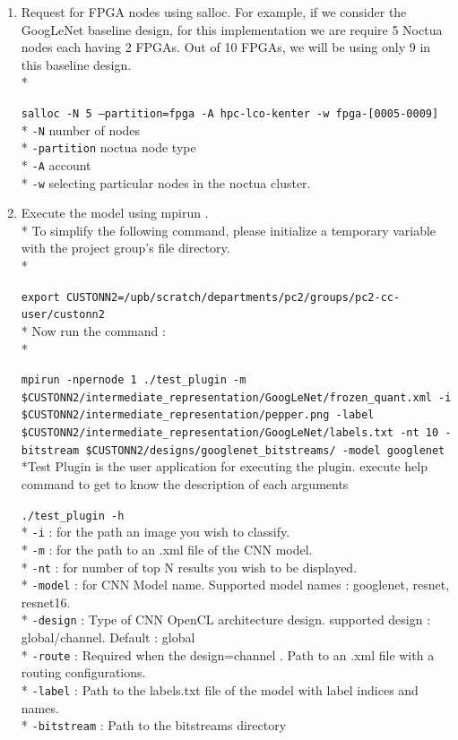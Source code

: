 \begin{enumerate}
\item Request for FPGA nodes using salloc. For example, if we consider the GoogLeNet baseline design, for this implementation we are require 5 Noctua nodes each having 2 FPGAs. Out of 10 FPGAs, we will be using only 9 in this baseline design. \medskip \\* \raggedright\texttt{salloc -N 5 --partition=fpga -A hpc-lco-kenter -w fpga-[0005-0009]} \medskip \\* \texttt{-N} number of nodes \\* \texttt{-partition} noctua node type \\* \texttt{-A} account  \\* \texttt{-w} selecting particular nodes in the noctua cluster.
\item Execute the model using mpirun . \\* To simplify the following command, please initialize a temporary variable with the project group's file directory. \\* \raggedright\texttt{export CUSTONN2=/upb/scratch/departments/pc2/groups/pc2-cc-user/custonn2} \medskip \\* Now run the command : \medskip \\* \raggedright\texttt{mpirun -npernode 1 ./test\_plugin -m \$CUSTONN2/intermediate\_representation/GoogLeNet/frozen\_quant.xml -i \$CUSTONN2/intermediate\_representation/pepper.png -label \$CUSTONN2/intermediate\_representation/GoogLeNet/labels.txt -nt 10 -bitstream \$CUSTONN2/designs/googlenet\_bitstreams/ -model googlenet} \medskip \\*Test Plugin is the user application for executing the plugin. execute help command to get to know the description of each arguments \medskip \raggedright\texttt{./test\_plugin -h}  \medskip \\* \texttt{-i} : for the path an image you wish to classify.  \\* \texttt{-m} : for the path to an .xml file of the CNN model. \\* \texttt{-nt} : for number of top N results you wish to be displayed.  \\* \texttt{-model} : for CNN Model name. Supported model names : googlenet, resnet, resnet16. \\* \texttt{-design} :  Type of CNN OpenCL architecture design. supported design : global/channel. Default : global \\* \texttt{-route} : Required when the design=channel . Path to an .xml file with a routing configurations.  \\* \texttt{-label} :  Path to the labels.txt file of the model with label indices and names.  \\* \texttt{-bitstream} : Path to the bitstreams directory 


 
\end{enumerate}
 



